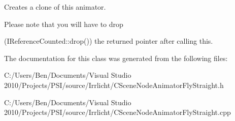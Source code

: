 Creates a clone of this animator. 

\begin{DoxyVerb}Please note that you will have to drop
\end{DoxyVerb}
 (I\-Reference\-Counted\-::drop()) the returned pointer after calling this. 

The documentation for this class was generated from the following files\-:\begin{DoxyCompactItemize}
\item 
C\-:/\-Users/\-Ben/\-Documents/\-Visual Studio 2010/\-Projects/\-P\-S\-I/source/\-Irrlicht/C\-Scene\-Node\-Animator\-Fly\-Straight.\-h\item 
C\-:/\-Users/\-Ben/\-Documents/\-Visual Studio 2010/\-Projects/\-P\-S\-I/source/\-Irrlicht/C\-Scene\-Node\-Animator\-Fly\-Straight.\-cpp\end{DoxyCompactItemize}
